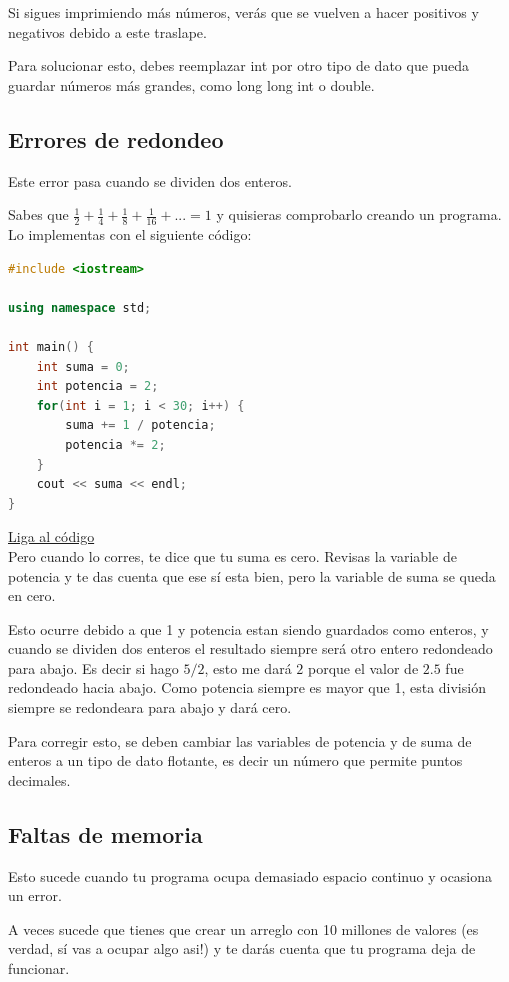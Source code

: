 \documentclass{article}
\begin{document}
Si sigues imprimiendo más números, verás que se vuelven a hacer positivos y negativos debido a este traslape.

Para solucionar esto, debes reemplazar int por otro tipo de dato que pueda guardar números más grandes, como long long int o double.

\subsection{Errores de redondeo}
Este error pasa cuando se dividen dos enteros.

Sabes que $\frac{1}{2} + \frac{1}{4} + \frac{1}{8} + \frac{1}{16} + ... = 1$ y quisieras comprobarlo creando un programa. Lo implementas con el siguiente código:

\begin{lstlisting}[language=C++, caption=Error de redondeo]
#include <iostream>

using namespace std;

int main() {
    int suma = 0;
    int potencia = 2;
    for(int i = 1; i < 30; i++) {
        suma += 1 / potencia;
        potencia *= 2;
    }
    cout << suma << endl;
}
\end{lstlisting}
\href{https://repl.it/@Jamesscn/Suma-Fraccional}{Liga al código}\\

Pero cuando lo corres, te dice que tu suma es cero. Revisas la variable de potencia y te das cuenta que ese sí esta bien, pero la variable de suma se queda en cero.

Esto ocurre debido a que 1 y potencia estan siendo guardados como enteros, y cuando se dividen dos enteros el resultado siempre será otro entero redondeado para abajo. Es decir si hago $5 / 2$, esto me dará $2$ porque el valor de $2.5$ fue redondeado hacia abajo. Como potencia siempre es mayor que 1, esta división siempre se redondeara para abajo y dará cero.

Para corregir esto, se deben cambiar las variables de potencia y de suma de enteros a un tipo de dato flotante, es decir un número que permite puntos decimales.

\subsection{Faltas de memoria}
Esto sucede cuando tu programa ocupa demasiado espacio continuo y ocasiona un error.

A veces sucede que tienes que crear un arreglo con 10 millones de valores (es verdad, sí vas a ocupar algo asi!) y te darás cuenta que tu programa deja de funcionar.
\end{document}
